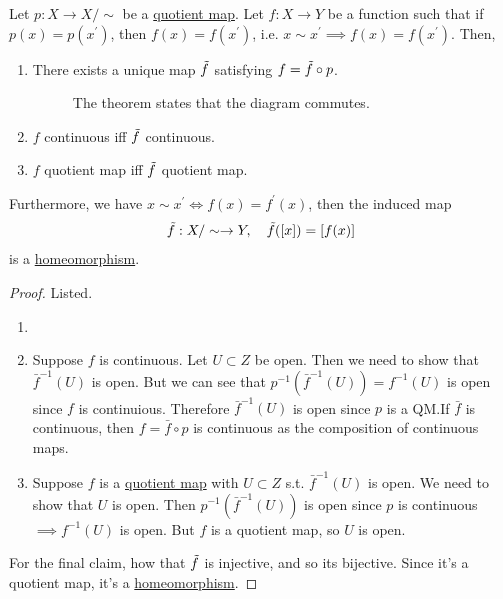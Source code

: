 	\begin{theorem}
		\label{thm:universal_quotient}
		\label{thm:quotient_homeomorphism}
    Let $p: X \rightarrow X/\sim$ be a \hyperref[def:quotient-map]{quotient map}. Let $f: X \rightarrow Y$ be a function such that if $p(x) = p(x^\prime)$, then $f(x) = f(x^\prime)$, i.e. $x \sim x^\prime \implies f(x) = f(x^\prime)$. Then, 
    \begin{enumerate}
			\item There exists a unique map $\Tilde{f}$ satisfying $f = \Tilde{f} \circ p$. 

      \begin{figure}[H]
        \centering 
        \caption{The theorem states that the diagram commutes. } 
        \label{fig:quotient_continuity}
      \end{figure}

      \item $f$ continuous iff $\Tilde{f}$ continuous. 
      \item $f$ quotient map iff $\Tilde{f}$ quotient map. 
    \end{enumerate}

		Furthermore, we have $x \sim x^\prime \iff f(x) = f^\prime(x)$, then the induced map 
		\begin{equation}
			\Tilde{f}: X/\sim \to Y, \quad \Tilde{f}([x]) = [f(x)] 
		\end{equation}
		is a \hyperref[def:homeomorphism]{homeomorphism}. 
  \end{theorem}
  \begin{proof}
    Listed. 
    \begin{enumerate}
      \item 
      \item Suppose $f$ is continuous. Let $U \subset Z$ be open. Then we need to show that $\bar{f}^{-1} (U)$ is open. But we can see that $p^{-1} (\bar{f}^{-1}(U)) = f^{-1} (U)$ is open since $f$ is continuious. Therefore $\bar{f}^{-1} (U)$ is open since $p$ is a QM.If $\bar{f}$ is continuous, then $f = \bar{f} \circ p$ is continuous as the composition of continuous maps. 
      \item Suppose $f$ is a \hyperref[def:quotient-map]{quotient map} with $U \subset Z$ s.t. $\bar{f}^{-1} (U)$ is open. We need to show that $U$ is open. Then $p^{-1} (\bar{f}^{-1} (U))$ is open since $p$ is continuous $\implies f^{-1} (U)$ is open. But $f$ is a quotient map, so $U$ is open. 
    \end{enumerate}
    For the final claim, how that $\Tilde{f}$ is injective, and so its bijective. Since it's a quotient map, it's a \hyperref[def:homeomorphism]{homeomorphism}. 
  \end{proof}

